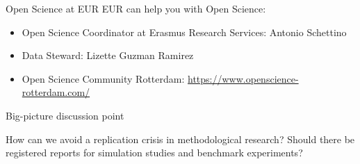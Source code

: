 \documentclass[pdfpagelabels=false, usepdftitle=false]{beamer}
\begin{document}
\begin{frame}{Open Science at EUR}
EUR can help you with Open Science:

\vfill

\begin{itemize}
  \item Open Science Coordinator at Erasmus Research Services:
  Antonio Schettino
  \bigskip
  \item Data Steward: Lizette Guzman Ramirez
  \bigskip
  \item Open Science Community Rotterdam:
  \url{https://www.openscience-rotterdam.com/}
\end{itemize}
\end{frame}


\begin{frame}{Big-picture discussion point}
\begin{itemize}
  \arrowitem How can we avoid a replication crisis in methodological research?
  \vfill
  \arrowitem \alert{Should there be registered reports for simulation studies
  and benchmark experiments?}
\end{itemize}
\end{frame}
\end{document}
